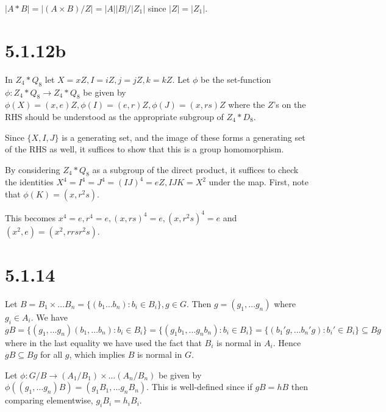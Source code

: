 \documentclass{article}
\begin{document}
$|A * B| = |(A \times B) / Z| = |A||B| / |Z_1|$ since $|Z| = |Z_1|$.

\section*{5.1.12b}

In $Z_4 * Q_8$ let $X = xZ, I = iZ, j = jZ, k = kZ$. Let $\phi$ be the set-function $\phi : Z_4 * Q_8 \to Z_4 * Q_8$ be given by $\phi(X) = (x, e)Z, \phi(I) = (e, r)Z, \phi(J) = (x, rs)Z$ where the $Z$'s on the RHS should be understood as the appropriate subgroup of $Z_4 * D_8$. 

Since $\{X, I, J\}$ is a generating set, and the image of these forms a generating set of the RHS as well, it suffices to show that this is a group homomorphism.

By considering $Z_4 * Q_8$ as a subgroup of the direct product, it suffices to check the identities $X^4 = I^4 = J^4 = (IJ)^4 = eZ, IJK = X^2$ under the map. First, note that $\phi(K) = (x, r^2s)$.

This becomes $x^4 = e, r^4 = e, (x, rs)^4 = e, (x, r^2s)^4 = e$ and $(x^2, e) = (x^2, rrsr^2s)$.
\section*{5.1.14}

Let $B = B_1 \times \ldots B_n = \{(b_1 \ldots b_n) : b_i \in B_i\}, g \in G$. Then $g = (g_1, \ldots g_n)$ where $g_i \in A_i$. We have $gB = \{(g_1, \ldots g_n)(b_1, \ldots b_n) : b_i \in B_i\} = \{(g_1b_1, \ldots g_nb_n) : b_i \in B_i\} = \{(b_1'g, \ldots b_n'g) : b_i' \in B_i\} \subseteq Bg$ where in the last equality we have used the fact that $B_i$ is normal in $A_i$. Hence $gB \subseteq Bg$ for all $g$, which implies $B$ is normal in $G$.

Let $\phi : G / B \to (A_1/B_1) \times \ldots (A_n/B_n)$ be given by $\phi((g_1, \ldots g_n)B) = (g_1B_1, \ldots g_nB_n)$. This is well-defined since if $gB = hB$ then comparing elementwise, $g_iB_i = h_iB_i$. 
\end{document}
